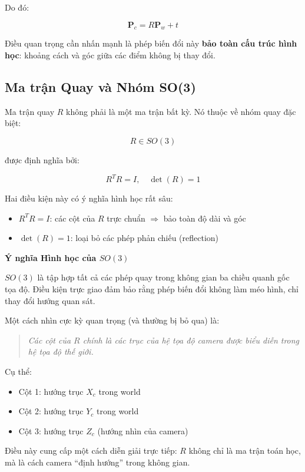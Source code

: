Do đó:

\[
\mathbf{P}_c = R \mathbf{P}_w + t
\]

Điều quan trọng cần nhấn mạnh là phép biến đổi này \textbf{bảo toàn cấu trúc hình học}: khoảng cách và góc giữa các điểm không bị thay đổi.

\subsection{Ma trận Quay và Nhóm SO(3)}
\label{subsec:rotation_matrix}

Ma trận quay $R$ không phải là một ma trận bất kỳ. Nó thuộc về nhóm quay đặc biệt:

\[
R \in SO(3)
\]

được định nghĩa bởi:

\[
R^T R = I, \quad \det(R) = 1
\]

Hai điều kiện này có ý nghĩa hình học rất sâu:

\begin{itemize}
	\item $R^T R = I$: các cột của $R$ trực chuẩn $\Rightarrow$ bảo toàn độ dài và góc
	\item $\det(R) = 1$: loại bỏ các phép phản chiếu (reflection)
\end{itemize}

\begin{mdframed}[style=infobox]
	\textbf{Ý nghĩa Hình học của $SO(3)$}
	
	$SO(3)$ là tập hợp tất cả các phép quay trong không gian ba chiều quanh gốc tọa độ. Điều kiện trực giao đảm bảo rằng phép biến đổi không làm méo hình, chỉ thay đổi hướng quan sát.
\end{mdframed}

Một cách nhìn cực kỳ quan trọng (và thường bị bỏ qua) là:

\begin{quote}
	\textit{Các cột của $R$ chính là các trục của hệ tọa độ camera được biểu diễn trong hệ tọa độ thế giới.}
\end{quote}

Cụ thể:
\begin{itemize}
	\item Cột 1: hướng trục $X_c$ trong world
	\item Cột 2: hướng trục $Y_c$ trong world
	\item Cột 3: hướng trục $Z_c$ (hướng nhìn của camera)
\end{itemize}

Điều này cung cấp một cách diễn giải trực tiếp: $R$ không chỉ là ma trận toán học, mà là cách camera “định hướng” trong không gian.

